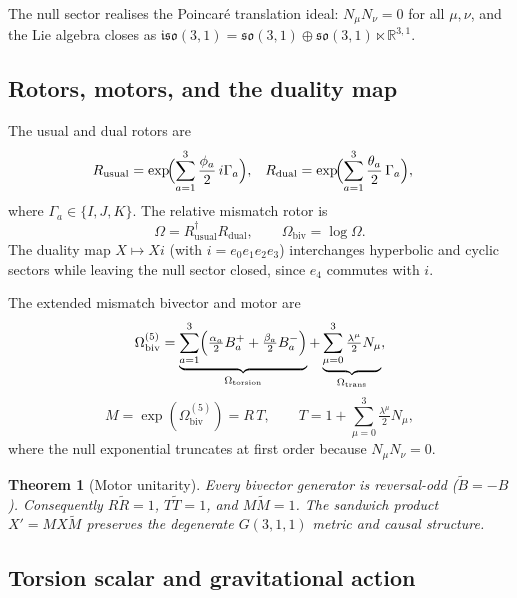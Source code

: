\documentclass[dvipdfmx,a4paper]{article}
\newtheorem{theorem}{Theorem}[section]
\theoremstyle{definition}
\begin{document}
The null sector realises the Poincar\'{e} translation ideal: $N_\mu N_\nu=0$ for all $\mu,\nu$, and the Lie algebra closes as $\mathfrak{iso}(3,1)=\mathfrak{so}(3,1)\oplus\mathfrak{so}(3,1)\ltimes\mathbb{R}^{3,1}$.

\subsection{Rotors, motors, and the duality map}

The usual and dual rotors are
\begin{align}
R_{\mathrm{usual}} &= \exp\!\Bigl(\sum_{a=1}^3 \frac{\phi_a}{2}\, i\Gamma_a\Bigr),
&
R_{\mathrm{dual}} &= \exp\!\Bigl(\sum_{a=1}^3 \frac{\theta_a}{2}\, \Gamma_a\Bigr),
\end{align}
where $\Gamma_a\in\{I,J,K\}$. The relative mismatch rotor is
\begin{equation}
\Omega = R_{\mathrm{usual}}^\dagger R_{\mathrm{dual}},
\qquad
\Omega_{\mathrm{biv}} = \log\Omega.
\label{eq:omega}
\end{equation}
The duality map $X\mapsto Xi$ (with $i=e_0e_1e_2e_3$) interchanges hyperbolic and cyclic sectors while leaving the null sector closed, since $e_4$ commutes with $i$.

The extended mismatch bivector and motor are
\begin{equation}
\Omega_{\mathrm{biv}}^{(5)}
= \underbrace{\sum_{a=1}^3 \Bigl(\tfrac{\alpha_a}{2}B_a^{+} + \tfrac{\beta_a}{2}B_a^{-}\Bigr)}_{\Omega_{\mathrm{torsion}}}
+ \underbrace{\sum_{\mu=0}^{3}\tfrac{\lambda^\mu}{2}N_\mu}_{\Omega_{\mathrm{trans}}},
\label{eq:omega5}
\end{equation}
\begin{equation}
M = \exp(\Omega_{\mathrm{biv}}^{(5)}) = R\,T,
\qquad
T = 1 + \sum_{\mu=0}^{3}\tfrac{\lambda^\mu}{2}N_\mu,
\label{eq:motor}
\end{equation}
where the null exponential truncates at first order because $N_\mu N_\nu=0$.

\begin{theorem}[Motor unitarity]
\label{thm:unitarity}
Every bivector generator is reversal-odd ($\widetilde{B}=-B$). Consequently $R\widetilde{R}=1$, $T\widetilde{T}=1$, and $M\widetilde{M}=1$. The sandwich product $X'=MX\widetilde{M}$ preserves the degenerate $G(3,1,1)$ metric and causal structure.
\end{theorem}

\subsection{Torsion scalar and gravitational action}
\end{document}
